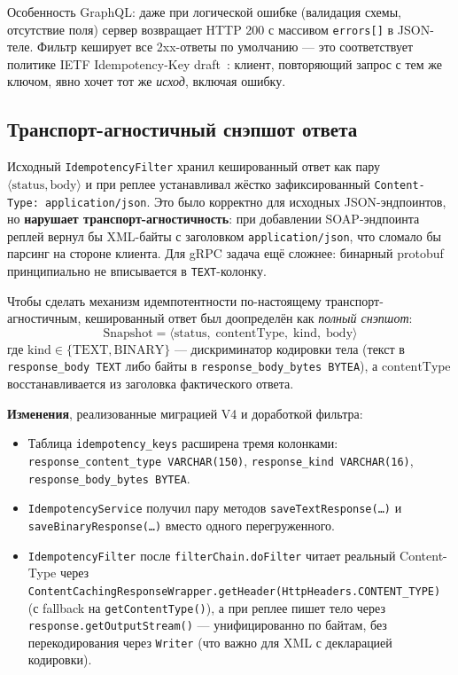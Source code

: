Особенность GraphQL: даже при логической ошибке (валидация схемы, отсутствие поля) сервер возвращает HTTP 200 с массивом \texttt{errors[]} в JSON-теле. Фильтр кеширует все 2xx-ответы по умолчанию --- это соответствует политике IETF Idempotency-Key draft~\cite{ietf-idempotency-key}: клиент, повторяющий запрос с тем же ключом, явно хочет тот же \emph{исход}, включая ошибку.

\subsection{Транспорт-агностичный снэпшот ответа}
\label{subsec:transport-agnostic-snapshot}

Исходный \texttt{IdempotencyFilter} хранил кешированный ответ как пару $\langle \text{status}, \text{body} \rangle$ и при реплее устанавливал жёстко зафиксированный \texttt{Content-Type: application/json}. Это было корректно для исходных JSON-эндпоинтов, но \textbf{нарушает транспорт-агностичность}: при добавлении SOAP-эндпоинта реплей вернул бы XML-байты с заголовком \texttt{application/json}, что сломало бы парсинг на стороне клиента. Для gRPC задача ещё сложнее: бинарный protobuf принципиально не вписывается в \texttt{TEXT}-колонку.

Чтобы сделать механизм идемпотентности по-настоящему транспорт-агностичным, кешированный ответ был доопределён как \emph{полный снэпшот}:
\begin{equation}
\text{Snapshot} = \langle \text{status},\; \text{contentType},\; \text{kind},\; \text{body} \rangle
\end{equation}
где $\text{kind} \in \{\text{TEXT}, \text{BINARY}\}$ --- дискриминатор кодировки тела (текст в \texttt{response\_body TEXT} либо байты в \texttt{response\_body\_bytes BYTEA}), а $\text{contentType}$ восстанавливается из заголовка фактического ответа.

\textbf{Изменения}, реализованные миграцией V4 и доработкой фильтра:
\begin{itemize}
    \item Таблица \texttt{idempotency\_keys} расширена тремя колонками: \texttt{response\_content\_type VARCHAR(150)}, \texttt{response\_kind VARCHAR(16)}, \texttt{response\_body\_bytes BYTEA}.
    \item \texttt{IdempotencyService} получил пару методов \texttt{saveTextResponse(\dots)} и \texttt{saveBinaryResponse(\dots)} вместо одного перегруженного.
    \item \texttt{IdempotencyFilter} после \texttt{filterChain.doFilter} читает реальный Content-Type через \texttt{ContentCachingResponseWrapper.getHeader(HttpHeaders.CONTENT\_TYPE)} (с fallback на \texttt{getContentType()}), а при реплее пишет тело через \texttt{response.getOutputStream()} --- унифицированно по байтам, без перекодирования через \texttt{Writer} (что важно для XML с декларацией кодировки).
\end{itemize}

